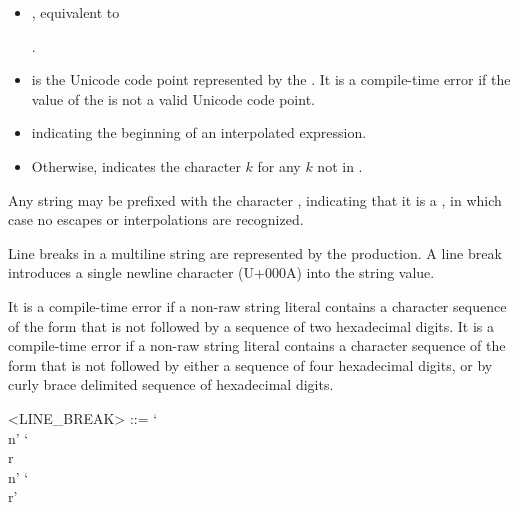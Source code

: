 \documentclass[makeidx]{article}
\begin{document}
{\begin{itemize}
  .
\item
  ,
  equivalent to

  \noindent
  .
\item
   is
  the Unicode code point represented by the
  .
  It is a compile-time error if the value of the
  is not a valid Unicode code point.
  {\color{normativeColor}}
\item
  \lit{\$} indicating the beginning of an interpolated expression.
\item
  { %
    \def\k{$k$}
    Otherwise, \syntax{`\\\k'} indicates the character \k{} for
    any \k{} not in .
  }
\end{itemize}

\LMHash{}%
Any string may be prefixed with the character ,
indicating that it is a ,
in which case no escapes or interpolations are recognized.

\LMHash{}%
Line breaks in a multiline string are represented by
the  production.
A line break introduces a single newline character (U+000A)
into the string value.

\LMHash{}%
It is a compile-time error if a non-raw string literal contains
a character sequence of the form  that is not followed by
a sequence of two hexadecimal digits.
It is a compile-time error if a non-raw string literal contains
a character sequence of the form  that is not followed by
either a sequence of four hexadecimal digits,
or by curly brace delimited sequence of hexadecimal digits.

\begin{grammar}
<LINE\_BREAK> ::= `\\n'
  \alt `\\r\\n'
  \alt `\\r'
\end{grammar}

}
\end{document}
